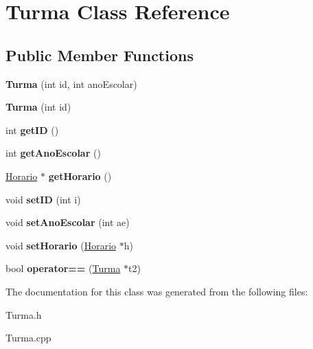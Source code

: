 \hypertarget{class_turma}{\section{Turma Class Reference}
\label{class_turma}
}
\subsection*{Public Member Functions}
\begin{DoxyCompactItemize}
\item 
\hypertarget{class_turma_a6a392c8d9e5b824ce0460740c9bfcdc9}{{\bfseries Turma} (int id, int ano\-Escolar)}\label{class_turma_a6a392c8d9e5b824ce0460740c9bfcdc9}

\item 
\hypertarget{class_turma_a68d82f9338997281af20221fff43b509}{{\bfseries Turma} (int id)}\label{class_turma_a68d82f9338997281af20221fff43b509}

\item 
\hypertarget{class_turma_a25bc31537a7fb3345712b780ff2f825f}{int {\bfseries get\-I\-D} ()}\label{class_turma_a25bc31537a7fb3345712b780ff2f825f}

\item 
\hypertarget{class_turma_a18af6d19b01102c00f07720f7b149252}{int {\bfseries get\-Ano\-Escolar} ()}\label{class_turma_a18af6d19b01102c00f07720f7b149252}

\item 
\hypertarget{class_turma_af23a78e8b0130542d662f9d1c20b9422}{\hyperlink{class_horario}{Horario} $\ast$ {\bfseries get\-Horario} ()}\label{class_turma_af23a78e8b0130542d662f9d1c20b9422}

\item 
\hypertarget{class_turma_a5c011a25251cd40d549e504b71d7b18f}{void {\bfseries set\-I\-D} (int i)}\label{class_turma_a5c011a25251cd40d549e504b71d7b18f}

\item 
\hypertarget{class_turma_abd1be35d1d394aeca1818ed643845ff8}{void {\bfseries set\-Ano\-Escolar} (int ae)}\label{class_turma_abd1be35d1d394aeca1818ed643845ff8}

\item 
\hypertarget{class_turma_aab28fe642d927ba176ec4259fdc2d8e0}{void {\bfseries set\-Horario} (\hyperlink{class_horario}{Horario} $\ast$h)}\label{class_turma_aab28fe642d927ba176ec4259fdc2d8e0}

\item 
\hypertarget{class_turma_a52d07a750b962cfb81c2067858d9d08a}{bool {\bfseries operator==} (\hyperlink{class_turma}{Turma} $\ast$t2)}\label{class_turma_a52d07a750b962cfb81c2067858d9d08a}

\end{DoxyCompactItemize}


The documentation for this class was generated from the following files\-:\begin{DoxyCompactItemize}
\item 
Turma.\-h\item 
Turma.\-cpp\end{DoxyCompactItemize}

